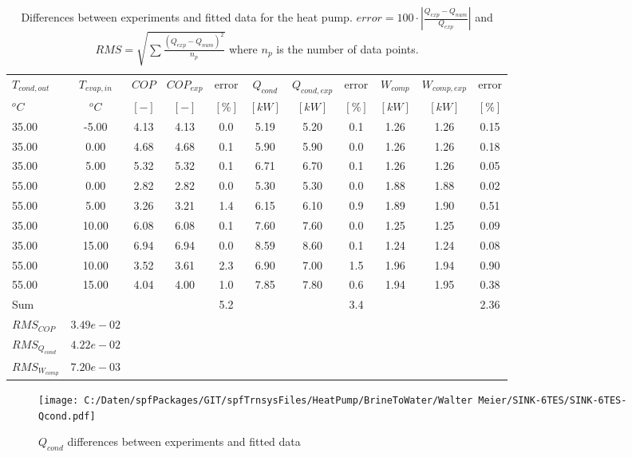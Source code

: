 \documentclass[english]{SPFShortReport}
\begin{document}
\begin{table}[!ht]
\begin{small}
\caption{Differences between experiments and fitted data for the heat pump.          $error=100 \cdot |\frac{Q_{exp}-Q_{num}}{Q_{exp}}|$ and $RMS = \sqrt { \sum{\frac{(Q_{exp}-Q_{num})^2}{n_p}} }$ where $n_p$ is the number of data points.}
\begin{center}
\resizebox{12cm}{!} 
{
\begin{tabular}{l | c c c c c c c c c c } 
\hline
\hline
$T_{cond,out}$ &$T_{evap,in}$ &$COP$ &$COP_{exp}$ &error &$Q_{cond}$ &$Q_{cond,exp}$ &error &$W_{comp}$ &$W_{comp,exp}$ &error \\ 
$^oC$ &$^oC$ &$[-]$ &$[-]$ &$[\%]$ &$[kW]$ &$[kW]$ &$[\%]$ &$[kW]$ &$[kW]$ &$[\%]$\\ 
\hline
35.00  & -5.00 & 4.13 & 4.13 & 0.0 & 5.19 & 5.20 & 0.1 & 1.26 & 1.26 & 0.15\\ 
35.00  & 0.00 & 4.68 & 4.68 & 0.1 & 5.90 & 5.90 & 0.0 & 1.26 & 1.26 & 0.18\\ 
35.00  & 5.00 & 5.32 & 5.32 & 0.1 & 6.71 & 6.70 & 0.1 & 1.26 & 1.26 & 0.05\\ 
55.00  & 0.00 & 2.82 & 2.82 & 0.0 & 5.30 & 5.30 & 0.0 & 1.88 & 1.88 & 0.02\\ 
55.00  & 5.00 & 3.26 & 3.21 & 1.4 & 6.15 & 6.10 & 0.9 & 1.89 & 1.90 & 0.51\\ 
35.00  & 10.00 & 6.08 & 6.08 & 0.1 & 7.60 & 7.60 & 0.0 & 1.25 & 1.25 & 0.09\\ 
35.00  & 15.00 & 6.94 & 6.94 & 0.0 & 8.59 & 8.60 & 0.1 & 1.24 & 1.24 & 0.08\\ 
55.00  & 10.00 & 3.52 & 3.61 & 2.3 & 6.90 & 7.00 & 1.5 & 1.96 & 1.94 & 0.90\\ 
55.00  & 15.00 & 4.04 & 4.00 & 1.0 & 7.85 & 7.80 & 0.6 & 1.94 & 1.95 & 0.38\\ 
\hline 
 Sum &  & &  & 5.2 &  &  & 3.4 & &  & 2.36\\ 
\hline 
 $RMS_{COP}$ & $3.49e-02$ \\ 
 $RMS_{Q_{cond}}$ & $4.22e-02$ \\ 
 $RMS_{W_{comp}}$ & $7.20e-03$ \\ 
\hline
\hline
\end{tabular}
}
\label{ErrorsTable}
\end{center}
\end{small}
\end{table}
\begin{figure}[!ht]
\begin{center}
\texttt{[image: C:/Daten/spfPackages/GIT/spfTrnsysFiles/HeatPump/BrineToWater/Walter Meier/SINK-6TES/SINK-6TES-Qcond.pdf]}
\caption{$Q_{cond}$ differences between experiments and fitted data}
\label{QcongFig}
\end{center}
\end{figure}
\end{document}
